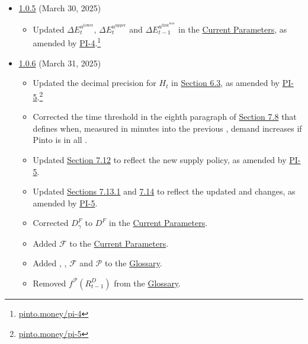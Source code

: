 \documentclass[class=article, crop=false]{standalone}
\begin{document}
\begin{itemize}[topsep=0pt, itemsep=3pt,leftmargin=16pt]
    \item \href{https://github.com/pinto-org/whitepaper/blob/master/version-history/pinto1_0_5.pdf}{1.0.5} (March 30, 2025)
    
    \begin{itemize}
        \item Updated $\Delta E_{t}^{u^{\text{lower}}}$, $\Delta E_{t}^{u^{\text{upper}}}$ and $\Delta E_{t-1}^{u^{\text{first}^{\text{max}}}}$ in the \hyperlink{subsection.12.1}{Current Parameters}, as amended by \href{https://pinto.money/pi-4}{PI-4}.\footnote{\href{https://pinto.money/pi-4}{pinto.money/pi-4}}       
    \end{itemize}


    \item \href{https://github.com/pinto-org/whitepaper/blob/master/version-history/pinto1_0_6.pdf}{1.0.6} (March 31, 2025)
    
    \begin{itemize}
        \item Updated the decimal precision for $H_{t}$ in \hyperlink{subsection.6.3}{Section 6.3}, as amended by \href{https://pinto.money/pi-5}{PI-5}.\footnote{\href{https://pinto.money/pi-5}{pinto.money/pi-5}} 
        \item Corrected the time threshold in the eighth paragraph of \hyperlink{subsection.7.8}{Section 7.8} that defines when, measured in minutes into the previous ,  demand increases if Pinto is  in all .
        \item Updated \hyperlink{subsection.7.12}{Section 7.12} to reflect the new  supply policy, as amended by \href{https://pinto.money/pi-5}{PI-5}.
        \item Updated \hyperlink{subsubsection.7.13.1}{Sections 7.13.1} and \hyperlink{subsection.7.14}{7.14} to reflect the updated  and  changes, as amended by \href{https://pinto.money/pi-5}{PI-5}.
        \item Corrected $D_{\gamma}^{F}$ to $D^{F}$ in the \hyperlink{subsection.12.1}{Current Parameters}.
        \item Added $\mathscr{F}$ to the \hyperlink{subsection.12.1}{Current Parameters}.
        \item Added , , $\mathscr{F}$ and $\mathscr{P}$ to the \hyperlink{subsection.12.14}{Glossary}.
        \item Removed $f^{\mathscr{P}}(R_{t-1}^{D})$ from the \hyperlink{subsection.12.14}{Glossary}.
    \end{itemize}


\end{itemize}
\end{document}
